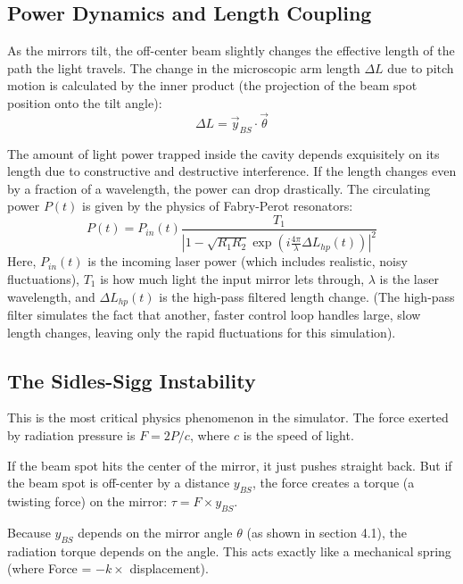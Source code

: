\documentclass{article}
\begin{document}
\subsection{Power Dynamics and Length Coupling}
As the mirrors tilt, the off-center beam slightly changes the effective length of the path the light travels. The change in the microscopic arm length $\Delta L$ due to pitch motion is calculated by the inner product (the projection of the beam spot position onto the tilt angle):
\begin{equation}
    \Delta L = \vec{y}_{BS} \cdot \vec{\theta}
\end{equation}

The amount of light power trapped inside the cavity depends exquisitely on its length due to constructive and destructive interference. If the length changes even by a fraction of a wavelength, the power can drop drastically. The circulating power $P(t)$ is given by the physics of Fabry-Perot resonators:
\begin{equation}
    P(t) = P_{in}(t) \frac{T_1}{\left| 1 - \sqrt{R_1 R_2} \exp\left(i \frac{4\pi}{\lambda} \Delta L_{hp}(t)\right) \right|^2}
\end{equation}
Here, $P_{in}(t)$ is the incoming laser power (which includes realistic, noisy fluctuations), $T_1$ is how much light the input mirror lets through, $\lambda$ is the laser wavelength, and $\Delta L_{hp}(t)$ is the high-pass filtered length change. (The high-pass filter simulates the fact that another, faster control loop handles large, slow length changes, leaving only the rapid fluctuations for this simulation).

\subsection{The Sidles-Sigg Instability}
This is the most critical physics phenomenon in the simulator. The force exerted by radiation pressure is $F = 2P/c$, where $c$ is the speed of light. 

If the beam spot hits the center of the mirror, it just pushes straight back. But if the beam spot is off-center by a distance $y_{BS}$, the force creates a torque (a twisting force) on the mirror: $\tau = F \times y_{BS}$. 

Because $y_{BS}$ depends on the mirror angle $\theta$ (as shown in section 4.1), the radiation torque depends on the angle. This acts exactly like a mechanical spring (where Force = $-k \times$ displacement). 
\end{document}
